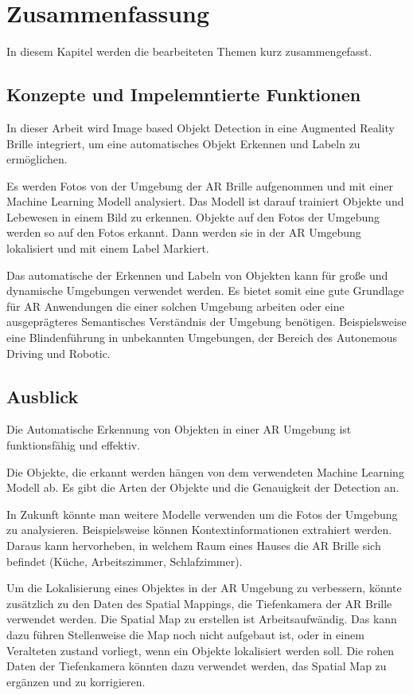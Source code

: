 \section{Zusammenfassung}

In diesem Kapitel werden die bearbeiteten Themen kurz zusammengefasst.

\subsection{Konzepte und Impelemntierte Funktionen}

In dieser Arbeit wird Image based Objekt Detection in eine Augmented Reality Brille integriert, um eine automatisches Objekt Erkennen und Labeln zu ermöglichen.

Es werden Fotos von der Umgebung der AR Brille aufgenommen und mit einer Machine Learning Modell analysiert.
Das Modell ist darauf trainiert Objekte und Lebewesen in einem Bild zu erkennen. Objekte auf den Fotos der Umgebung werden so auf den Fotos erkannt. Dann werden sie in der AR Umgebung lokalisiert und mit einem Label Markiert.

Das automatische der Erkennen und Labeln von Objekten kann für große und dynamische Umgebungen verwendet werden. Es bietet somit eine gute Grundlage für AR Anwendungen die einer solchen Umgebung arbeiten oder eine ausgeprägteres Semantisches Verständnis der Umgebung benötigen. Beispielsweise eine Blindenführung in unbekannten Umgebungen, der Bereich des Autonemous Driving und Robotic. 

\subsection{Ausblick}

Die Automatische Erkennung von Objekten in einer AR Umgebung ist funktionsfähig und effektiv.

Die Objekte, die erkannt werden hängen von dem verwendeten Machine Learning Modell ab. Es gibt die Arten der Objekte und die Genauigkeit der Detection an. %

In Zukunft könnte man weitere Modelle verwenden um die Fotos der Umgebung zu analysieren. Beispielsweise können Kontextinformationen extrahiert werden. Daraus kann hervorheben, in welchem Raum eines Hauses die AR Brille sich befindet (Küche, Arbeitszimmer, Schlafzimmer).

Um die Lokalisierung eines Objektes in der AR Umgebung zu verbessern, könnte zusätzlich zu den Daten des Spatial Mappings, die Tiefenkamera der AR Brille verwendet werden. Die Spatial Map zu erstellen ist Arbeitsaufwändig. Das kann dazu führen Stellenweise die Map noch nicht aufgebaut ist, oder in einem Veralteten zustand vorliegt, wenn ein Objekte lokalisiert werden soll. Die rohen Daten der Tiefenkamera könnten dazu verwendet werden, das Spatial Map zu ergänzen und zu korrigieren.
